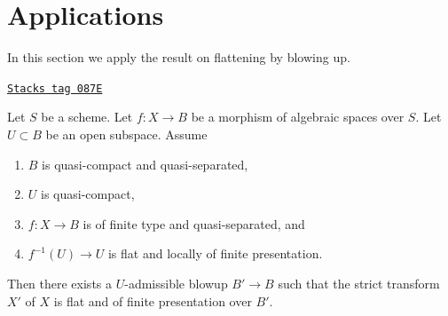 \section{Applications}
\label{spaces-more-morphisms-section-applications-flattening-by-blowing-up}
In this section we apply the result on flattening by blowing up.

\begin{lemma}
\label{spaces-more-morphisms-lemma-flat-after-blowing-up}
\href{https://stacks.math.columbia.edu/tag/087E}{\texttt{Stacks tag 087E}}

Let $S$ be a scheme. Let $f : X \to B$ be a morphism of algebraic
spaces over $S$. Let $U \subset B$ be an open subspace. Assume
\begin{enumerate}
\item $B$ is quasi-compact and quasi-separated,
\item $U$ is quasi-compact,
\item $f : X \to B$ is of finite type and quasi-separated, and
\item $f^{-1}(U) \to U$ is flat and locally of finite presentation.
\end{enumerate}
Then there exists a $U$-admissible blowup $B' \to B$ such that
the strict transform $X'$ of $X$ is flat and of finite presentation
over $B'$.
\end{lemma}

